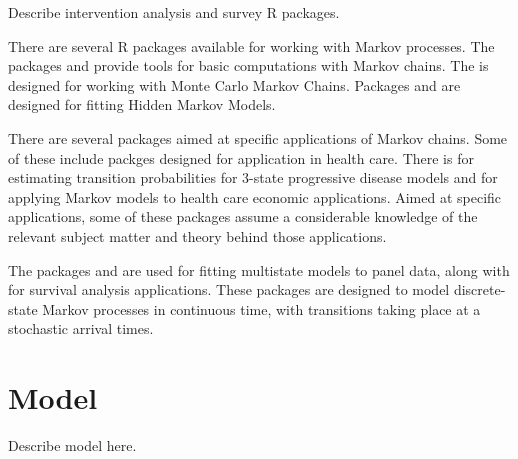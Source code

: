 \documentclass[article]{jss}
\begin{document}
Describe intervention analysis and survey R packages.

% 
There are several R packages \citep{R} available for working with Markov processes. 
% 
The packages  \citep{pkg:markovchain} and  \citep{pkg:DTMCPack} provide tools for basic computations with Markov chains.  
% 
The  is designed for working with Monte Carlo Markov Chains. 
% 
Packages  \citep{pkg:mcmc} and  \citep{pkg:depmixS4} are designed for fitting Hidden Markov Models. 
%

There are several packages aimed at specific applications of Markov chains. 
% 
Some of these include packges designed for application in health care. 
There is  \citep{pkg:TPmsm} for estimating transition probabilities for 3-state progressive disease models and  \citep{pkg:heemod} for applying Markov models to health care economic applications. 
% 
Aimed at specific applications, some of these packages assume a considerable knowledge of the relevant subject matter and theory behind those applications. 
% 

The packages  \citep{pkg:msm} and  \citep{pkg:SemiMarkov} are used for fitting multistate models to panel data, along with  \citep{pkg:mstate} for survival analysis applications. 
These packages are designed to model discrete-state Markov processes in continuous time, with transitions taking place at a stochastic arrival times. 



\section[Model]{Model} \label{sec:model}


Describe model here.



\end{document}
